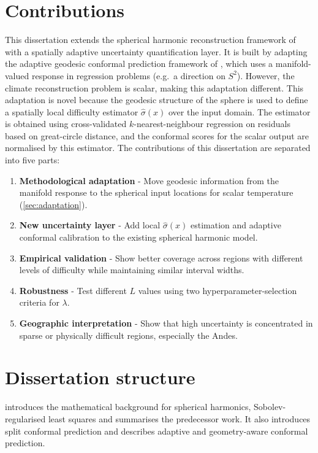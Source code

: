 \documentclass[11pt,a4paper]{report}
\begin{document}
\section{Contributions}

This dissertation extends the spherical harmonic reconstruction framework of \citet{thomas2025} with a spatially adaptive uncertainty quantification layer. It is built by adapting the adaptive geodesic conformal prediction framework of \citet{amirishahbazi2026}, which uses a manifold-valued response in regression problems (e.g.\ a direction on $S^2$). However, the climate reconstruction problem is scalar, making this adaptation different. This adaptation is novel because the geodesic structure of the sphere is used to define a spatially local difficulty estimator $\hat\sigma(x)$ over the input domain. The estimator is obtained using cross-validated $k$-nearest-neighbour regression on residuals based on great-circle distance, and the conformal scores for the scalar output are normalised by this estimator. The contributions of this dissertation are separated into five parts:

\begin{enumerate}
    \item \textbf{Methodological adaptation} - Move geodesic information from the manifold response to the spherical input locations for scalar temperature (\cref{sec:adaptation}).
    \item \textbf{New uncertainty layer} - Add local $\hat{\sigma}(x)$ estimation and adaptive conformal calibration to the existing spherical harmonic model.
    \item \textbf{Empirical validation} - Show better coverage across regions with different levels of difficulty while maintaining similar interval widths.
    \item \textbf{Robustness} - Test different $L$ values using two hyperparameter-selection criteria for $\lambda$.
    \item \textbf{Geographic interpretation} - Show that high uncertainty is concentrated in sparse or physically difficult regions, especially the Andes.
\end{enumerate}

\section{Dissertation structure}

 introduces the mathematical background for spherical harmonics, Sobolev-regularised least squares and summarises the predecessor work. It also introduces split conformal prediction and describes adaptive and geometry-aware conformal prediction. 
\end{document}
